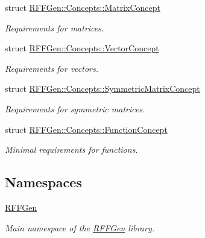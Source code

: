 \begin{DoxyCompactItemize}
struct \hyperlink{structRFFGen_1_1Concepts_1_1MatrixConcept}{R\-F\-F\-Gen\-::\-Concepts\-::\-Matrix\-Concept}
\begin{DoxyCompactList}\small\item\em Requirements for matrices. \end{DoxyCompactList}\item 
struct \hyperlink{structRFFGen_1_1Concepts_1_1VectorConcept}{R\-F\-F\-Gen\-::\-Concepts\-::\-Vector\-Concept}
\begin{DoxyCompactList}\small\item\em Requirements for vectors. \end{DoxyCompactList}\item 
struct \hyperlink{structRFFGen_1_1Concepts_1_1SymmetricMatrixConcept}{R\-F\-F\-Gen\-::\-Concepts\-::\-Symmetric\-Matrix\-Concept}
\begin{DoxyCompactList}\small\item\em Requirements for symmetric matrices. \end{DoxyCompactList}\item 
struct \hyperlink{structRFFGen_1_1Concepts_1_1FunctionConcept}{R\-F\-F\-Gen\-::\-Concepts\-::\-Function\-Concept}
\begin{DoxyCompactList}\small\item\em Minimal requirements for functions. \end{DoxyCompactList}\end{DoxyCompactItemize}
\subsection*{Namespaces}
\begin{DoxyCompactItemize}
\item 
\hyperlink{namespaceRFFGen}{R\-F\-F\-Gen}
\begin{DoxyCompactList}\small\item\em Main namespace of the \hyperlink{namespaceRFFGen}{R\-F\-F\-Gen} library. \end{DoxyCompactList}\end{DoxyCompactItemize}
